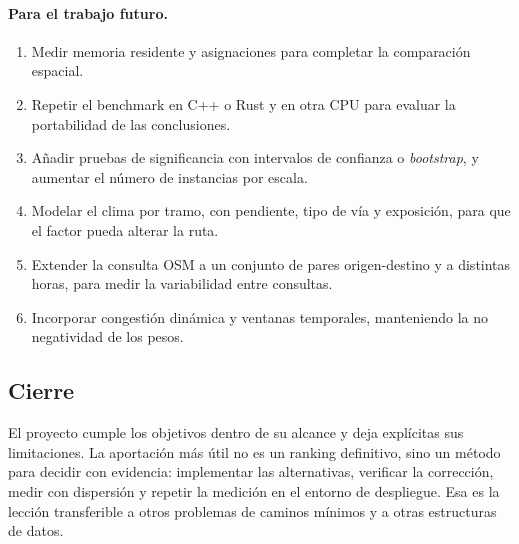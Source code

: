 \paragraph{Para el trabajo futuro.}
\begin{enumerate}
    \item Medir memoria residente y asignaciones para completar la comparación espacial.
    \item Repetir el benchmark en C++ o Rust y en otra CPU para evaluar la portabilidad de las conclusiones.
    \item Añadir pruebas de significancia con intervalos de confianza o \textit{bootstrap}, y aumentar el número de instancias por escala.
    \item Modelar el clima por tramo, con pendiente, tipo de vía y exposición, para que el factor pueda alterar la ruta.
    \item Extender la consulta OSM a un conjunto de pares origen-destino y a distintas horas, para medir la variabilidad entre consultas.
    \item Incorporar congestión dinámica y ventanas temporales, manteniendo la no negatividad de los pesos.
\end{enumerate}

\subsection{Cierre}
El proyecto cumple los objetivos dentro de su alcance y deja explícitas sus limitaciones. La aportación más útil no es un ranking definitivo, sino un método para decidir con evidencia: implementar las alternativas, verificar la corrección, medir con dispersión y repetir la medición en el entorno de despliegue. Esa es la lección transferible a otros problemas de caminos mínimos y a otras estructuras de datos.
